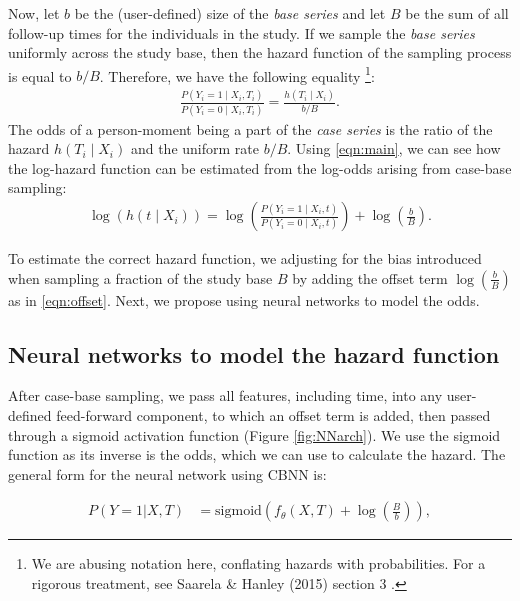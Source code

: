 \documentclass[APA,LATO1COL]{WileyNJD-v2}
\begin{document}
Now, let \(b\) be the (user-defined) size of the \emph{base series} and
let \(B\) be the sum of all follow-up times for the individuals in the
study. If we sample the \emph{base series} uniformly across the study
base, then the hazard function of the sampling process is equal to
\(b/B\). Therefore, we have the following equality
\footnote{We are abusing notation here, conflating hazards with probabilities. For a rigorous treatment, see Saarela \& Hanley (2015) section 3 \cite{saarela2015} .}:
\begin{align}\label{eqn:main}
\frac{P\left(Y_i=1 \mid X_i, T_i\right)}{P\left(Y_i = 0 \mid X_i, T_i\right)} = \frac{h\left(T_i \mid X_i\right)}{b/B}.
\end{align} The odds of a person-moment being a part of the \emph{case
series} is the ratio of the hazard \(h(T_i \mid X_i)\) and the uniform
rate \(b/B\). Using \eqref{eqn:main}, we can see how the log-hazard
function can be estimated from the log-odds arising from case-base
sampling: \begin{align}\label{eqn:offset}
\log \left( h\left(t \mid X_i\right)\right) = \log \left(\frac{P\left(Y_i = 1 \mid X_i, t\right)}{P\left(Y_i = 0 \mid X_i, t\right)}\right) + \log\left(\frac{b}{B}\right).
\end{align}

To estimate the correct hazard function, we adjusting for the bias
introduced when sampling a fraction of the study base \(B\) by adding
the offset term \(\log\left(\frac{b}{B} \right)\) as in
\eqref{eqn:offset}. Next, we propose using neural networks to model the
odds.

\hypertarget{neural-networks-to-model-the-hazard-function}{%
\subsection{Neural networks to model the hazard
function}\label{neural-networks-to-model-the-hazard-function}}

After case-base sampling, we pass all features, including time, into any
user-defined feed-forward component, to which an offset term is added,
then passed through a sigmoid activation function (Figure
\ref{fig:NNarch}). We use the sigmoid function as its inverse is the
odds, which we can use to calculate the hazard. The general form for the
neural network using CBNN is:

\begin{align}\label{eqn:nnProb}
P\left(Y=1|X,T\right)&=\mathrm{sigmoid}\left(f_{\theta}(X, T) + \log\left(\frac{B}{b}\right) \right),
\end{align}
\end{document}
